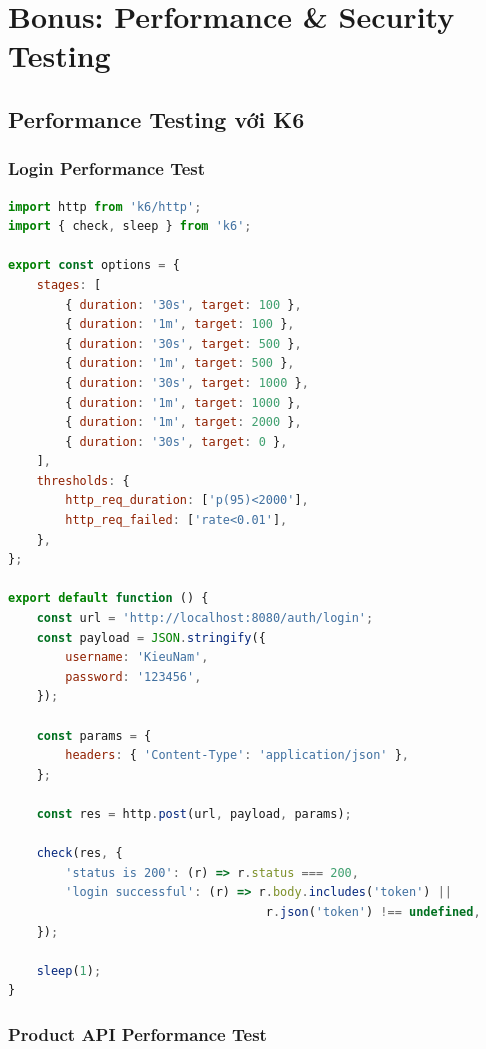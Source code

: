 \section{Bonus: Performance \& Security Testing}

\subsection{Performance Testing với K6}

\subsubsection{Login Performance Test}

\begin{lstlisting}[language=JavaScript, caption=Performance.login.js - Login Load Test]
import http from 'k6/http';
import { check, sleep } from 'k6';

export const options = {
    stages: [
        { duration: '30s', target: 100 },
        { duration: '1m', target: 100 },
        { duration: '30s', target: 500 },
        { duration: '1m', target: 500 },
        { duration: '30s', target: 1000 },
        { duration: '1m', target: 1000 },
        { duration: '1m', target: 2000 },
        { duration: '30s', target: 0 },
    ],
    thresholds: {
        http_req_duration: ['p(95)<2000'],
        http_req_failed: ['rate<0.01'],
    },
};

export default function () {
    const url = 'http://localhost:8080/auth/login';
    const payload = JSON.stringify({
        username: 'KieuNam',
        password: '123456',
    });

    const params = {
        headers: { 'Content-Type': 'application/json' },
    };

    const res = http.post(url, payload, params);

    check(res, {
        'status is 200': (r) => r.status === 200,
        'login successful': (r) => r.body.includes('token') || 
                                    r.json('token') !== undefined,
    });

    sleep(1);
}
\end{lstlisting}

\subsubsection{Product API Performance Test}

